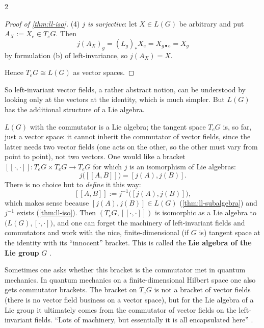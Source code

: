 \begin{paracol}{2}
\begin{proof}[Proof of \cref{thm:ll-iso}]
(4) \emph{$j$ is surjective}: let $X\in L(G)$ be arbitrary and put $A_X:=X_e\in T_eG$. Then
\[
  j(A_X)_g=(L_g)_*X_e=X_{g\bullet e}=X_g
\]
by formulation (b) of left-invariance, so $j(A_X)=X$.      \par
Hence $T_eG\cong L(G)$ as vector spaces. 
\end{proof}
So left-invariant vector fields, a rather abstract notion, can be understood by looking only at the vectors at the identity, which is much simpler. But $L(G)$ has the additional structure of a Lie algebra.

\begin{definition}\label{def:ll-lie-algebra-of-G}
$L(G)$ with the commutator is a Lie algebra; the tangent space $T_eG$ is, so far, just a vector space: it cannot inherit the commutator of vector fields, since the latter needs two vector fields (one acts on the other, so the other must vary from point to point), not two vectors. One would like a bracket $[\![\cdot,\cdot]\!]\colon T_eG\times T_eG\to T_eG$ for which $j$ is an isomorphism of Lie algebras:
\[
  j\bigl([\![A,B]\!]\bigr)=[j(A),j(B)].
\]
There is no choice but to \emph{define} it this way:
\[
  [\![A,B]\!]:=j^{-1}\bigl([j(A),j(B)]\bigr),
\]
which makes sense because $[j(A),j(B)]\in L(G)$ (\cref{thm:ll-subalgebra}) and $j^{-1}$ exists (\cref{thm:ll-iso}). Then $(T_eG,[\![\cdot,\cdot]\!])$ is isomorphic as a Lie algebra to $\bigl(L(G),[\cdot,\cdot]\bigr)$, and one can forget the machinery of left-invariant fields and commutators and work with the nice, finite-dimensional (if $G$ is) tangent space at the identity with its ``innocent'' bracket. This is called the \textbf{Lie algebra of the Lie group} $G$           .
\end{definition}
\begin{aside}
Sometimes one asks whether this bracket is the commutator met in quantum mechanics. In quantum mechanics on a finite-dimensional Hilbert space one also gets commutator brackets. The bracket on $T_eG$ is not a bracket of vector fields (there is no vector field business on a vector space), but for the Lie algebra of a Lie group it ultimately comes from the commutator of vector fields on the left-invariant fields. ``Lots of machinery, but essentially it is all encapsulated here''  .
\end{aside}


\end{paracol}
